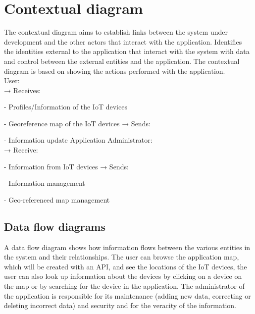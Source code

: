 \documentclass{scrreprt}
\begin{document}
\chapter{Contextual diagram}

The contextual diagram aims to establish links between the system under
development and the other actors that interact with the application.
\newline
Identifies the identities external to the application that interact with
the system with data and control between the external entities and the application.
The contextual diagram is based on showing the actions performed with the
application. \\
\newline
User: \\
\newline
→ Receives:

- Profiles/Information of the IoT devices

- Georeference map of the IoT devices
\newline
→ Sends:

- Information update \newline
\newline
Application Administrator: \\
\newline
→ Receive:

- Information from IoT devices
\newline
→ Sends:

- Information management

- Geo-referenced map management

\section{Data flow diagrams}

A data flow diagram shows how information flows between the various entities
in the system and their relationships.
The user can browse the application map, which will be created with an API,
and see the locations of the IoT devices, the user can also look up information
about the devices by clicking on a device on the map or by searching for
the device in the application. The administrator of the application is responsible for
its maintenance (adding new data, correcting or deleting incorrect data)
and security and for the veracity of the information.
\end{document}
